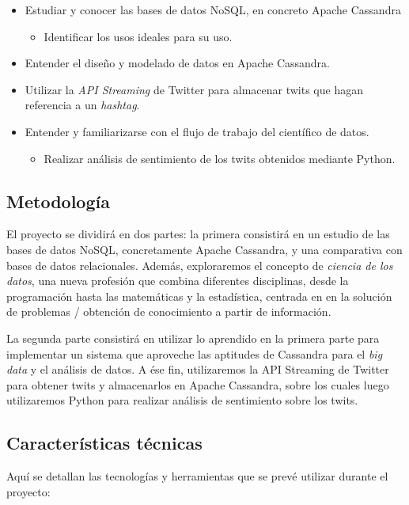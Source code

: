 \begin{itemize}
    \item Estudiar y conocer las bases de datos NoSQL, en concreto Apache Cassandra
      \begin{itemize}
      \item Identificar los usos ideales para su uso.
      \end{itemize}
    \item Entender el diseño y modelado de datos en Apache Cassandra.
    \item Utilizar la \emph{API Streaming} de Twitter para almacenar twits que
      hagan referencia a un \emph{hashtag}.
    \item Entender y familiarizarse con el flujo de trabajo del científico de datos.
      \begin{itemize}
      \item Realizar análisis de sentimiento de los twits obtenidos mediante Python.
      \end{itemize}
\end{itemize}

\subsection{Metodología}
\label{subsec:metodologia}

El proyecto se dividirá en dos partes: la primera consistirá en un estudio de
las bases de datos NoSQL, concretamente Apache Cassandra, y una
comparativa con bases de datos relacionales. Además, exploraremos el concepto de
\emph{ciencia de los datos}, una nueva profesión que combina diferentes
disciplinas, desde la programación hasta las matemáticas y la estadística,
centrada en en la solución de problemas / obtención de conocimiento a partir de
información. 

La segunda parte consistirá en utilizar lo aprendido en la primera parte para
implementar un sistema que aproveche las aptitudes de Cassandra para el
\emph{big data} y el análisis de datos. A ése fin, utilizaremos la API Streaming
de Twitter para obtener twits y almacenarlos en Apache Cassandra, sobre los
cuales luego utilizaremos Python para realizar análisis de sentimiento sobre los
twits.

\subsection{Características técnicas}
\label{subsec:planificació}

Aquí se detallan las tecnologías y herramientas que se prevé
utilizar durante el proyecto:

